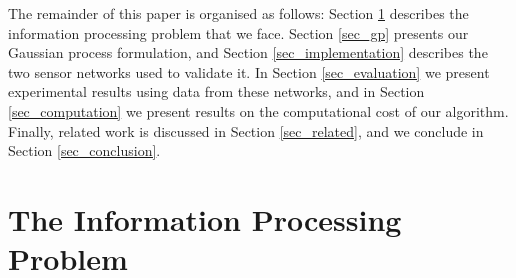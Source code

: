 \documentclass{acmtrans2m}
\begin{document}
The remainder of this paper is organised as follows: Section \ref{sec_info} describes the information processing problem that we face. Section \ref{sec_gp} presents our Gaussian process formulation, and Section \ref{sec_implementation} describes the two sensor networks used to validate it. In Section \ref{sec_evaluation} we present experimental results using data from these networks, and in Section \ref{sec_computation} we present results on the computational cost of our algorithm. Finally, related work is discussed in Section \ref{sec_related}, and we conclude in Section \ref{sec_conclusion}.

\section{The Information Processing Problem}\label{sec_info}
\end{document}
